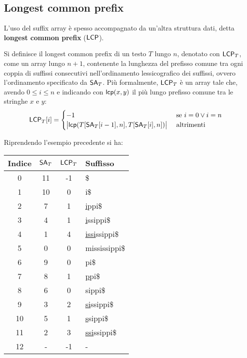 \subsection{Longest common prefix}
L'uso del suffix array è spesso accompagnato da un'altra struttura
dati, detta \textbf{longest common prefix} ($\mbox{\rm {\sf LCP}}$).
\begin{definizione}
  Si definisce il longest common prefix di un testo $T$
  lungo $n$,
  denotato con $\mbox{\rm {\sf LCP}}_T$, come un array lungo $n+1$, contenente la
  lunghezza del prefisso comune tra ogni coppia di suffissi consecutivi
  nell'ordinamento lessicografico dei suffissi, ovvero l'ordinamento specificato
  da $\mbox{\rm {\sf SA}}_T$. Più formalmente,
  $\mbox{\rm {\sf LCP}}_T$ è un array tale che, avendo $0\leq i\leq n$ e indicando con
  $\mbox{\rm {\sf lcp}}(x,y)$ il più lungo prefisso comune tra le stringhe $x$ e $y$:
  \begin{equation}
    \label{eq:lcpdef}
    \mbox{\rm {\sf LCP}}_T[i]=
    \begin{cases}
      -1&\mbox{ se } i=0 \lor i=n\\
      \big\lvert\mbox{\rm {\sf lcp}}(T[\mbox{\rm {\sf SA}}_T[i-1], n],T[\mbox{\rm {\sf SA}}_T [i], n])\big\rvert&\mbox{
        altrimenti} 
    \end{cases}
  \end{equation}
\end{definizione}
\begin{esempio}
  Riprendendo l'esempio precedente si ha:
  \begin{table}[H]
    \centering
    \footnotesize
    \begin{tabular}{c|c|c|l} 
      \textbf{Indice} & $\mbox{\rm {\sf SA}}_T$ & $\mbox{\rm {\sf LCP}}_T$ & \textbf{Suffisso}\\ 
      \hline
      0 & 11 & -1 & \$\\
      1 & 10 & 0 & i\$\\
      2 & 7 & 1 & \underline{i}ppi\$\\
      3 & 4 & 1 & \underline{i}ssippi\$\\
      4 & 1 & 4 & \underline{issi}ssippi\$\\
      5 & 0 & 0 & mississippi\$\\
      6 & 9 & 0 & pi\$\\
      7 & 8 & 1 & \underline{p}pi\$\\
      8 & 6 & 0 & sippi\$\\
      9 & 3 & 2 & \underline{si}ssippi\$\\
      10 & 5 & 1 & \underline{s}sippi\$\\
      11 & 2 & 3 & \underline{ssi}ssippi\$\\
      12 & - & -1 & -
    \end{tabular}
  \end{table}
\end{esempio}
